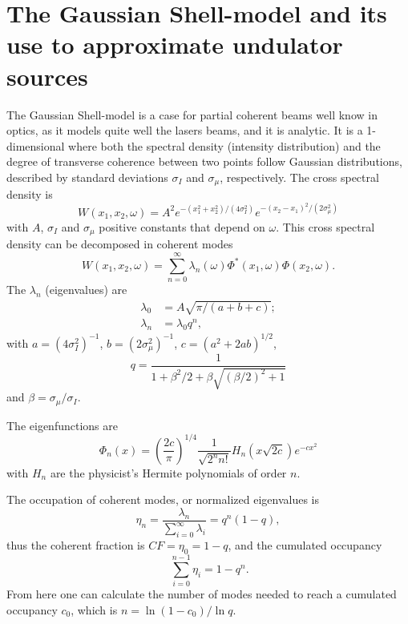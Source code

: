 \documentclass{iucr}              %
\begin{document}
\appendix

\section{The Gaussian Shell-model and its use to approximate undulator sources}
\label{appendix:matchCF}
The Gaussian Shell-model is a case for partial coherent beams well know in optics, as it models quite well the lasers beams, and it is analytic. It is a 1-dimensional where both the spectral density (intensity distribution) and the degree of transverse coherence between two points follow Gaussian distributions, described by standard deviations $\sigma_I$ and $\sigma_{\mu}$, respectively. The cross spectral density is
\begin{equation}
W(x_1,x_2,\omega) = A^2 e^{-(x_1^2+x_2^2)/(4 \sigma_I^2)} e^{-(x_2-x_1)^2/(2 \sigma_{\mu}^2)}
\label{GS_CSD}
\end{equation}
with $A$, $\sigma_I$ and $\sigma_{\mu}$ positive constants that depend on $\omega$.
This cross spectral density can be decomposed in coherent modes
\cite{Starikov82,mandel_wolf} 
\begin{equation}
W(x_1,x_2,\omega) = \sum_{n=0}^{\infty} \lambda_n(\omega) \Phi^*(x_1,\omega) \Phi(x_2,\omega). 
\label{CMD}
\end{equation}
The $\lambda_n$ (eigenvalues) are
\begin{align}
\lambda_0 &= A \sqrt{\pi/( a+b+c)}; \\ 
\lambda_n &= \lambda_0 q ^n,
\end{align}
with $a = (4 \sigma_I^2)^{-1}$, $ 
b = (2 \sigma_{\mu}^2)^{-1}$, $ 
c = (a^2 + 2 a b)^{1/2}$,
\begin{equation}
q = \frac{1}{1 + \beta^2/2 + \beta\sqrt{(\beta/2)^2+1}} 
\label{q}
\end{equation}
and $\beta=\sigma_{\mu}/\sigma_I$. 

The eigenfunctions are
\begin{equation}
\Phi_n(x) = \left( \frac{2c}{\pi} \right)^{1/4} \frac{1}{\sqrt{2^n n!}} H_n(x\sqrt{2c})e^{-cx^2}
\label{GSeigenvalues}
\end{equation}
with $H_n$ are the physicist's Hermite polynomials of order $n$. 

The occupation of coherent modes, or normalized eigenvalues is   
\begin{equation}
\eta_n = \frac{\lambda_n}{\sum_{i=0}^{\infty} \lambda_i} = q^n(1-q), 
\end{equation}
thus the coherent fraction is $CF=\eta_0=1-q$, and the cumulated occupancy
\begin{equation}
\ \sum_{i=0}^{n-1} \eta_i = 1-q^n. 
\end{equation}
From here one can calculate the number of modes needed to reach a cumulated occupancy $c_0$, which is $n=\ln(1-c_0)/\ln q$.
\end{document}
